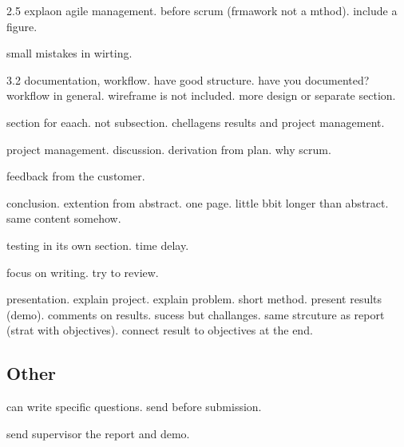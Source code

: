 2.5 explaon agile management. before scrum (frmawork not a mthod). include a figure. 

small mistakes in wirting. 

3.2 documentation, workflow. have good structure. have you documented? workflow in general. wireframe is not included. more design or separate section. 

section for eaach. not subsection. chellagens results and project management. 

project management. discussion. derivation from plan. why scrum. 

feedback from the customer. 

conclusion. extention from abstract. one page. little bbit longer than abstract. same content somehow. 

testing in its own section. time delay. 

focus on writing. try to review. 


presentation. explain project. explain problem. short method. present results (demo). comments on results. sucess but challanges. same strcuture as report (strat with objectives). connect result to objectives at the end.

\subsection{Other}
can write specific questions. send before submission. 

send supervisor the report and demo. 



